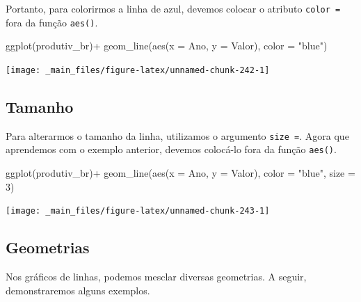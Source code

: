\documentclass[
  brazilian,
]{book}
\newenvironment{Shaded}{\begin{snugshade}}{\end{snugshade}}
\newcommand{\AttributeTok}[1]{\textcolor[rgb]{0.77,0.63,0.00}{#1}}
\newcommand{\DecValTok}[1]{\textcolor[rgb]{0.00,0.00,0.81}{#1}}
\newcommand{\FunctionTok}[1]{\textcolor[rgb]{0.00,0.00,0.00}{#1}}
\newcommand{\NormalTok}[1]{#1}
\newcommand{\SpecialCharTok}[1]{\textcolor[rgb]{0.00,0.00,0.00}{#1}}
\newcommand{\StringTok}[1]{\textcolor[rgb]{0.31,0.60,0.02}{#1}}
\begin{document}
Portanto, para colorirmos a linha de azul, devemos colocar o atributo \texttt{color\ =} fora da função \texttt{aes()}.

\begin{Shaded}
\begin{Highlighting}[]
\FunctionTok{ggplot}\NormalTok{(produtiv\_br)}\SpecialCharTok{+}
  \FunctionTok{geom\_line}\NormalTok{(}\FunctionTok{aes}\NormalTok{(}\AttributeTok{x =}\NormalTok{ Ano,}
                \AttributeTok{y =}\NormalTok{ Valor),}
            \AttributeTok{color =} \StringTok{"blue"}\NormalTok{)}
\end{Highlighting}
\end{Shaded}

\begin{center}\texttt{[image: \_main\_files/figure-latex/unnamed-chunk-242-1]} \end{center}

\hypertarget{tamanho-1}{%
\subsection{Tamanho}\label{tamanho-1}}

Para alterarmos o tamanho da linha, utilizamos o argumento \texttt{size\ =}. Agora que aprendemos com o exemplo anterior, devemos colocá-lo fora da função \texttt{aes()}.

\begin{Shaded}
\begin{Highlighting}[]
\FunctionTok{ggplot}\NormalTok{(produtiv\_br)}\SpecialCharTok{+}
  \FunctionTok{geom\_line}\NormalTok{(}\FunctionTok{aes}\NormalTok{(}\AttributeTok{x =}\NormalTok{ Ano,}
                \AttributeTok{y =}\NormalTok{ Valor),}
            \AttributeTok{color =} \StringTok{"blue"}\NormalTok{,}
            \AttributeTok{size =} \DecValTok{3}\NormalTok{)}
\end{Highlighting}
\end{Shaded}

\begin{center}\texttt{[image: \_main\_files/figure-latex/unnamed-chunk-243-1]} \end{center}

\hypertarget{geometrias}{%
\subsection{Geometrias}\label{geometrias}}

Nos gráficos de linhas, podemos mesclar diversas geometrias. A seguir, demonstraremos alguns exemplos.
\end{document}
